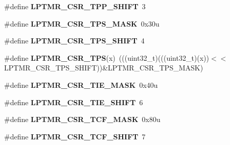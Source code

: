 \begin{DoxyCompactItemize}
\item 
\#define {\bfseries L\+P\+T\+M\+R\+\_\+\+C\+S\+R\+\_\+\+T\+P\+P\+\_\+\+S\+H\+I\+FT}~3\hypertarget{group__LPTMR__Register__Masks_ga62be70d70bd4e88e26e5cc8437f6fd55}{}\label{group__LPTMR__Register__Masks_ga62be70d70bd4e88e26e5cc8437f6fd55}

\item 
\#define {\bfseries L\+P\+T\+M\+R\+\_\+\+C\+S\+R\+\_\+\+T\+P\+S\+\_\+\+M\+A\+SK}~0x30u\hypertarget{group__LPTMR__Register__Masks_ga3502ccff1cbdb70bb99b73c035ab1e19}{}\label{group__LPTMR__Register__Masks_ga3502ccff1cbdb70bb99b73c035ab1e19}

\item 
\#define {\bfseries L\+P\+T\+M\+R\+\_\+\+C\+S\+R\+\_\+\+T\+P\+S\+\_\+\+S\+H\+I\+FT}~4\hypertarget{group__LPTMR__Register__Masks_ga7759d842742bfedd91788d41ef12fb8d}{}\label{group__LPTMR__Register__Masks_ga7759d842742bfedd91788d41ef12fb8d}

\item 
\#define {\bfseries L\+P\+T\+M\+R\+\_\+\+C\+S\+R\+\_\+\+T\+PS}(x)~(((uint32\+\_\+t)(((uint32\+\_\+t)(x))$<$$<$L\+P\+T\+M\+R\+\_\+\+C\+S\+R\+\_\+\+T\+P\+S\+\_\+\+S\+H\+I\+FT))\&L\+P\+T\+M\+R\+\_\+\+C\+S\+R\+\_\+\+T\+P\+S\+\_\+\+M\+A\+SK)\hypertarget{group__LPTMR__Register__Masks_ga21ce2f3d05c087f7f46dcb9b7035e4f2}{}\label{group__LPTMR__Register__Masks_ga21ce2f3d05c087f7f46dcb9b7035e4f2}

\item 
\#define {\bfseries L\+P\+T\+M\+R\+\_\+\+C\+S\+R\+\_\+\+T\+I\+E\+\_\+\+M\+A\+SK}~0x40u\hypertarget{group__LPTMR__Register__Masks_gabb726cb43d5f6ee38339048c69a5f086}{}\label{group__LPTMR__Register__Masks_gabb726cb43d5f6ee38339048c69a5f086}

\item 
\#define {\bfseries L\+P\+T\+M\+R\+\_\+\+C\+S\+R\+\_\+\+T\+I\+E\+\_\+\+S\+H\+I\+FT}~6\hypertarget{group__LPTMR__Register__Masks_gaaedba0195b3abfcae6e8669f84f39d5d}{}\label{group__LPTMR__Register__Masks_gaaedba0195b3abfcae6e8669f84f39d5d}

\item 
\#define {\bfseries L\+P\+T\+M\+R\+\_\+\+C\+S\+R\+\_\+\+T\+C\+F\+\_\+\+M\+A\+SK}~0x80u\hypertarget{group__LPTMR__Register__Masks_ga13b5dd6085ca2a8cf0f06550b7557b6b}{}\label{group__LPTMR__Register__Masks_ga13b5dd6085ca2a8cf0f06550b7557b6b}

\item 
\#define {\bfseries L\+P\+T\+M\+R\+\_\+\+C\+S\+R\+\_\+\+T\+C\+F\+\_\+\+S\+H\+I\+FT}~7\hypertarget{group__LPTMR__Register__Masks_ga0ffa48fac670327deffc2e17ef1dea68}{}\label{group__LPTMR__Register__Masks_ga0ffa48fac670327deffc2e17ef1dea68}


\end{DoxyCompactItemize}
